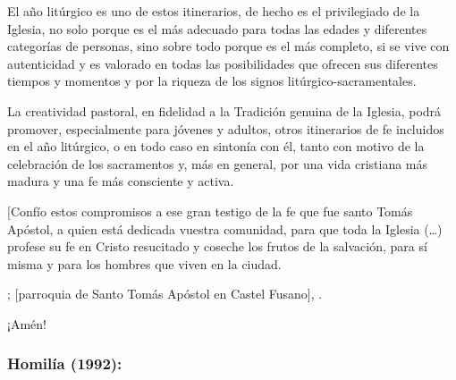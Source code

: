 \begin{body}
	El año litúrgico es uno de estos itinerarios, de hecho es el privilegiado de la Iglesia, no solo porque es el más adecuado para todas las edades y diferentes categorías de personas, sino sobre todo porque es el más completo, si se vive con autenticidad y es valorado en todas las posibilidades que ofrecen sus diferentes tiempos y momentos y por la riqueza de los signos litúrgico-sacramentales. 
	
	La creatividad pastoral, en fidelidad a la Tradición genuina de la Iglesia, podrá promover, especialmente para jóvenes y adultos, otros itinerarios de fe incluidos en el año litúrgico, o en todo caso en sintonía con él, tanto con motivo de la celebración de los sacramentos y, más en general, por una vida cristiana más madura y una fe más consciente y activa. 
	
	{[}Confío estos compromisos a ese gran testigo de la fe que fue santo Tomás Apóstol, a quien está dedicada vuestra comunidad, para que toda la Iglesia (\ldots{}) profese su fe en Cristo resucitado y coseche los frutos de la salvación, para sí misma y para los hombres que viven en la ciudad. 
	
	; {[}parroquia de Santo Tomás Apóstol en Castel Fusano{]}, . 
	
	¡Amén!
\end{body}

\subsubsection{Homilía (1992):}


